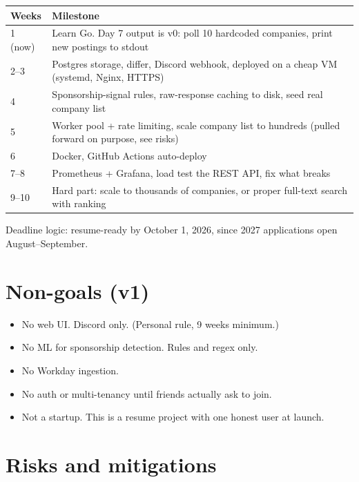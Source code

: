 \documentclass[11pt]{article}
\begin{document}
\begin{center}
\begin{tabular}{@{}l p{11.2cm}@{}}
\toprule
\textbf{Weeks} & \textbf{Milestone} \\
\midrule
1 (now) & Learn Go. Day 7 output is v0: poll 10 hardcoded companies, print new postings to stdout \\
2--3 & Postgres storage, differ, Discord webhook, deployed on a cheap VM (systemd, Nginx, HTTPS) \\
4 & Sponsorship-signal rules, raw-response caching to disk, seed real company list \\
5 & Worker pool + rate limiting, scale company list to hundreds (pulled forward on purpose, see risks) \\
6 & Docker, GitHub Actions auto-deploy \\
7--8 & Prometheus + Grafana, load test the REST API, fix what breaks \\
9--10 & Hard part: scale to thousands of companies, or proper full-text search with ranking \\
\bottomrule
\end{tabular}
\end{center}

Deadline logic: resume-ready by October 1, 2026, since 2027 applications open August--September.

\section*{Non-goals (v1)}

\begin{itemize}
  \item No web UI. Discord only. (Personal rule, 9 weeks minimum.)
  \item No ML for sponsorship detection. Rules and regex only.
  \item No Workday ingestion.
  \item No auth or multi-tenancy until friends actually ask to join.
  \item Not a startup. This is a resume project with one honest user at launch.
\end{itemize}

\section*{Risks and mitigations}
\end{document}
